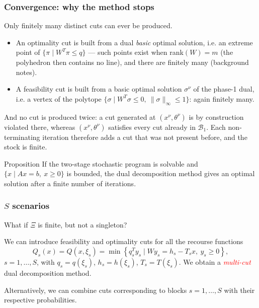 \documentclass[aspectratio=169]{beamer}
\begin{document}
\begin{frame}
\frametitle{Convergence: why the method stops}
\small

Only {\red finitely many distinct cuts} can ever be produced.
\begin{itemize}
\item
An optimality cut is built from a dual {\it basic} optimal solution, i.e. an extreme point of $\lbrace \pi \mid W^T\pi \leq q \rbrace$ --- such points exist when rank$(W) = m$ (the polyhedron then contains no line), and there are finitely many (background notes).
\item
A feasibility cut is built from a basic optimal solution $\sigma^{\nu}$ of the phase-1 dual, i.e. a vertex of the polytope $\lbrace \sigma \mid W^T\sigma \leq 0,\ \|\sigma\|_{\infty} \leq 1 \rbrace$: again finitely many.
\end{itemize}

And no cut is produced {\red twice}: a cut generated at $(x^{\nu}, \theta^{\nu})$ is by construction violated there, whereas $(x^{\nu}, \theta^{\nu})$ satisfies every cut already in $\mathcal{B}_1$.
Each non-terminating iteration therefore adds a cut that was not present before, and the stock is finite.

\begin{block}{Proposition}
If the two-stage stochastic program is solvable and $\lbrace x \mid Ax=b,\ x \geq 0 \rbrace$ is bounded, the dual decomposition method gives an optimal solution after a finite number of iterations.
\end{block}

\end{frame}

\begin{frame}
\frametitle{$S$ scenarios}

What if $\Xi$ is finite, but not a singleton?

\mbox{}

We can introduce feasibility and optimality cuts for all the recourse functions
\[
Q_{s}(x) = Q(x,\xi_s) = \min \left\lbrace q_{s}^T y_{s} \mid Wy_{s} = h_{s}-T_{s}x,\ y_{s} \geq 0 \right\rbrace,
\]
$s = 1,\ldots,S$, with $q_s = q(\xi_s)$, $h_s = h(\xi_s)$, $T_s = T(\xi_s)$.
We obtain a \textcolor{red}{\textsl{multi-cut}} dual decomposition method.

\mbox{}

Alternatively, we can combine cuts corresponding to blocks $s = 1,\ldots,S$ with their respective probabilities.

\end{frame}
\end{document}
